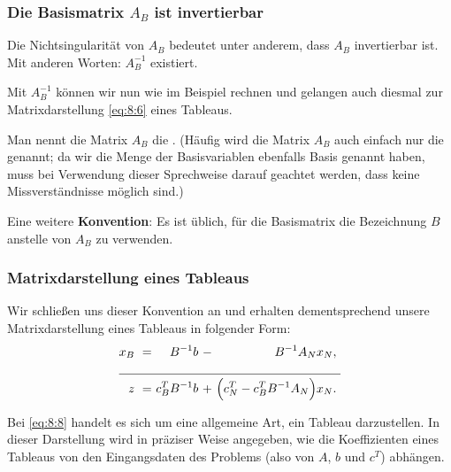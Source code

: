 \documentclass[smaller]{beamer}
\begin{document}
\begin{frame}
 \frametitle{Die Basismatrix $A_B$ ist invertierbar}
 Die Nichtsingularität von $A_B$ bedeutet unter anderem, dass $A_B$ invertierbar ist. Mit anderen Worten: $A_B^{-1}$ existiert. \\ \vspace*{0.2cm}

Mit $A_B^{-1}$ können wir nun wie im Beispiel rechnen und gelangen auch diesmal zur Matrixdarstellung \eqref{eq:8:6} eines Tableaus. \\ \vspace*{0.2cm}

Man nennt die Matrix $A_B$ die . (Häufig wird die Matrix $A_B$ auch einfach nur die  genannt; da wir die Menge der Basisvariablen ebenfalls {\glqq}Basis{\grqq} genannt haben, muss bei Verwendung dieser Sprechweise darauf geachtet werden, dass keine Missverständnisse möglich sind.) \\ \vspace*{0.2cm}

Eine weitere \textbf{Konvention}: \alert{Es ist üblich, für die Basismatrix die Bezeichnung $B$ anstelle von $A_B$ zu verwenden}.
\end{frame}

\begin{frame}
 \frametitle{Matrixdarstellung eines Tableaus}
 Wir schließen uns dieser Konvention an und erhalten dementsprechend unsere \alert{Matrixdarstellung eines Tableaus} in folgender Form:
\begin{align}
\begin{alignedat}{3}
\label{eq:8:8}
x_B &\ = &\ B^{-1}b &\ - &\ B^{-1}A_Nx_N,\ \\ \cline{1-5}
  z &\ = &\ c_B^TB^{-1}b &\ + &\ \Bigl( c_N^T - c_B^TB^{-1}A_N \Bigr)x_N.\
\end{alignedat}
\end{align}

Bei \eqref{eq:8:8} handelt es sich um eine allgemeine Art, ein Tableau darzustellen. \alert{In dieser Darstellung wird in präziser Weise angegeben, wie die Koeffizienten eines Tableaus von den Eingangsdaten des Problems (also von $A$, $b$ und $c^T$) abhängen}.
\end{frame}
\end{document}
